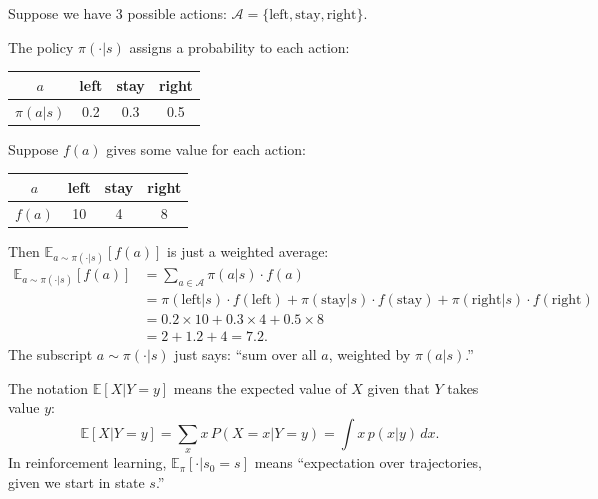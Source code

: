 \begin{example}
    Suppose we have 3 possible actions: $\mathcal{A} = \{\text{left}, \text{stay}, \text{right}\}$.

    The policy $\pi(\cdot|s)$ assigns a probability to each action:
    \begin{center}
        \begin{tabular}{c|ccc}
            $a$        & left & stay & right \\
            \hline
            $\pi(a|s)$ & 0.2  & 0.3  & 0.5
        \end{tabular}
    \end{center}

    Suppose $f(a)$ gives some value for each action:
    \begin{center}
        \begin{tabular}{c|ccc}
            $a$    & left & stay & right \\
            \hline
            $f(a)$ & 10   & 4    & 8
        \end{tabular}
    \end{center}

    Then $\mathbb{E}_{a \sim \pi(\cdot|s)}[f(a)]$ is just a weighted average:
    \begin{align*}
        \mathbb{E}_{a \sim \pi(\cdot|s)}[f(a)] & = \sum_{a \in \mathcal{A}} \pi(a|s) \cdot f(a)                                                                                  \\
                                               & = \pi(\text{left}|s) \cdot f(\text{left}) + \pi(\text{stay}|s) \cdot f(\text{stay}) + \pi(\text{right}|s) \cdot f(\text{right}) \\
                                               & = 0.2 \times 10 + 0.3 \times 4 + 0.5 \times 8                                                                                   \\
                                               & = 2 + 1.2 + 4 = 7.2.
    \end{align*}
    The subscript $a \sim \pi(\cdot|s)$ just says: ``sum over all $a$, weighted by $\pi(a|s)$.''
\end{example}

\begin{remark}
    The notation $\mathbb{E}[X | Y = y]$ means the expected value of $X$ given that $Y$ takes value $y$:
    \[
        \mathbb{E}[X | Y = y] = \sum_x x \, P(X = x | Y = y) = \int x \, p(x|y) \, dx.
    \]
    In reinforcement learning, $\mathbb{E}_\pi[\cdot | s_0 = s]$ means ``expectation over trajectories, given we start in state $s$.''
\end{remark}

